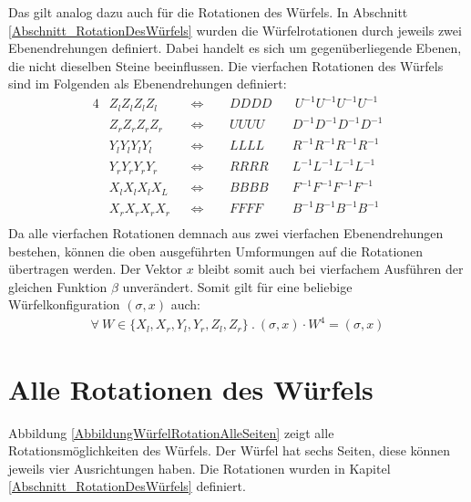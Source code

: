 \documentclass[12pt,a4paper, usenames, dvipsnames]{article}
\theoremstyle{mystyle}
\theoremstyle{definition}
\begin{document}
Das gilt analog dazu auch für die Rotationen des Würfels. In Abschnitt \ref{Abschnitt_RotationDesWürfels} wurden die Würfelrotationen durch jeweils zwei Ebenendrehungen definiert. Dabei handelt es sich um gegenüberliegende Ebenen, die nicht dieselben Steine beeinflussen. Die vierfachen Rotationen des Würfels sind im Folgenden als Ebenendrehungen definiert:
\begin{alignat*}{4}
& Z_lZ_lZ_lZ_l && \Leftrightarrow \ \ &&  DDDD  && \ U^{-1} U^{-1} U^{-1} U^{-1} \\
& Z_rZ_rZ_rZ_r && \Leftrightarrow &&   UUUU  && D^{-1}D^{-1}D^{-1}D^{-1}\\
& Y_lY_lY_lY_l && \Leftrightarrow && LLLL &&  R^{-1}R^{-1}R^{-1}R^{-1} \\
& Y_rY_rY_rY_r && \Leftrightarrow &&  RRRR &&  L^{-1} L^{-1} L^{-1} L^{-1} \\
& X_lX_lX_lX_L && \Leftrightarrow && BBBB &&  F^{-1}F^{-1}F^{-1}F^{-1} \\
& X_rX_rX_rX_r && \Leftrightarrow && FFFF  && B^{-1}B^{-1}B^{-1}B^{-1}   \\
\end{alignat*}
Da alle vierfachen Rotationen demnach aus zwei vierfachen Ebenendrehungen bestehen, können die oben ausgeführten Umformungen auf die Rotationen übertragen werden. Der Vektor $x$ bleibt somit auch bei vierfachem Ausführen der gleichen Funktion $\beta$ unverändert. Somit gilt für eine beliebige Würfelkonfiguration $(\sigma, x)$ auch:
\begin{align*}
\forall \ W \in \{X_l, X_r, Y_l, Y_r, Z_l, Z_r\} \ . \ (\sigma, x) \cdot W^4 = (\sigma, x)
\end{align*}





%
%
%
%
%
%
%
%
%
%
%
%
%
%
%
%
%
%
%
\newpage

\section{Alle Rotationen des Würfels}
\label{Anhang_RotationenDesWürfels}

Abbildung \ref{AbbildungWürfelRotationAlleSeiten} zeigt alle Rotationsmöglichkeiten des Würfels. Der Würfel hat sechs Seiten, diese können jeweils vier Ausrichtungen haben. Die Rotationen wurden in Kapitel \ref{Abschnitt_RotationDesWürfels} definiert.
\end{document}
